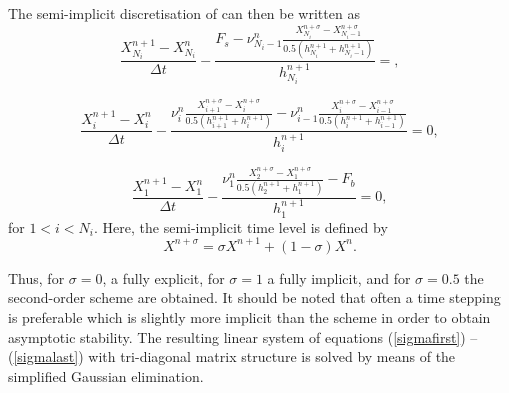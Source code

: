 The semi-implicit discretisation of 
can then be written as
 \begin{equation}\label{sigmafirst}
 \displaystyle
 \frac{X^{n+1}_{N_i}-X^n_{N_i}}{\Delta t}
 -\frac{F_s
 -\nu^n_{N_i-1}\frac{X^{n+\sigma}_{N_i}-X^{n+\sigma}_{N_i-1}}{0.5(h^{n+1}_{N_i}+h^{n+1}_{N_i-1})}}{h^{n
 +1}_{N_i}}
 =
  \comma
 \end{equation}

\begin{equation}\label{Xdiscrete}
\displaystyle
\frac{X^{n+1}_i-X^n_i}{\Delta t}
-\frac{\nu^n_i\frac{X^{n+\sigma}_{i+1}-X^{n+\sigma}_{i}}{0.5(h^{n+1}_{i+1}+h^{n+1}_i)}
-\nu^n_{i-1}\frac{X^{n+\sigma}_{i}-X^{n+\sigma}_{i-1}}{0.5(h^{n+1}_i+h^{n+1}_{i-1})}}{h^{n
+1}_i}
=0
\comma
\end{equation}

\begin{equation}\label{sigmalast}
\displaystyle
\frac{X^{n+1}_1-X^n_1}{\Delta t}
-\frac{\nu^n_1\frac{X^{n+\sigma}_{2}-X^{n+\sigma}_{1}}{0.5(h^{n+1}_{2}+h^{n+1}_1)}
-F_b}{h^{n+1}_1}
=0
\comma
\end{equation}
for $1<i<N_i$. Here, the semi-implicit time level is defined by
\begin{equation}
  X^{n+\sigma}=\sigma X^{n+1}+(1-\sigma)X^n.
\end{equation}


Thus, for $\sigma=0$, a fully explicit, for $\sigma=1$ a fully
implicit, and for $\sigma=0.5$ the \cite{CrankNicolson47} second-order
scheme are obtained. It should be noted that often a time stepping is
preferable which is slightly more implicit than the
\cite{CrankNicolson47} scheme in order to obtain
asymptotic stability.  The resulting linear system of equations
(\ref{sigmafirst}) -- (\ref{sigmalast}) with tri-diagonal matrix
structure is solved by means of the simplified Gaussian
elimination.

